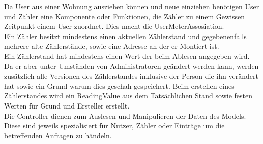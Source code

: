Da User aus einer Wohnung ausziehen können und neue einziehen benötigen User und Zähler eine Komponente oder Funktionen, die Zähler zu einem Gewissen Zeitpunkt einem User zuordnet. 
Dies macht die UserMeterAssosiation.\\
Ein Zähler besitzt mindestens einen aktuellen Zählerstand und gegebenenfalls mehrere alte Zählerstände, sowie eine Adresse an der er Montiert ist.\\
Ein Zählerstand hat mindestens einen Wert der beim Ablesen angegeben wird. 
Da er aber unter Umständen von Administratoren geändert werden kann, werden zusätzlich alle Versionen des Zählerstandes inklusive der Person die ihn verändert hat sowie ein Grund warum dies geschah gespeichert.
Beim erstellen eines Zählerstandes wird ein ReadingValue aus dem Tatsächlichen Stand sowie festen Werten für Grund und Ersteller erstellt.\\
Die Controller dienen zum Auslesen und Manipulieren der Daten des Models. 
Diese sind jeweils spezialisiert für Nutzer, Zähler oder Einträge um die betreffenden Anfragen zu händeln.
